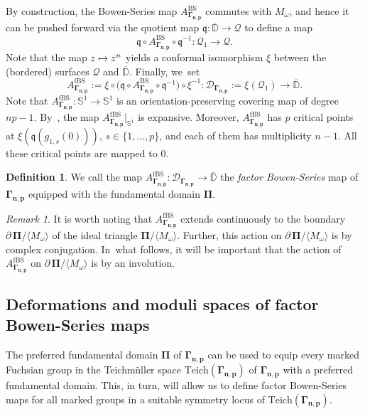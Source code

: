 \documentclass[10pt,a4paper]{amsart}
\def\mto{\mathchoice{\longmapsto}{\mapsto}{\mapsto}{\mapsto}}
\theoremstyle{definition}
\newtheorem{definition}[lemma]{Definition}
\theoremstyle{remark}
\newtheorem{remark}[lemma]{Remark}
\newcommand{\D}{\mathbb{D}}
\begin{document}
By construction, the Bowen-Series map $A_{\pmb{\Gamma_{n,p}}}^{\mathrm{BS}}$ commutes with $M_\omega$, and hence it can be pushed forward via the quotient map $\mathfrak{q}:\overline{\D}\to\mathcal{Q}$ to define a map
\[
\mathfrak{q}\circ A_{\pmb{\Gamma_{n,p}}}^{\mathrm{BS}}\circ\mathfrak{q}^{-1}: \mathcal{Q}_1\to\mathcal{Q}.
\]
Note that the map $z\mto z^{n}$ yields a conformal isomorphism $\xi$ between the (bordered) surfaces $\mathcal{Q}$ and $\overline{\D}$. Finally, we~set
\[
A_{\pmb{\Gamma_{n,p}}}^{\mathrm{fBS}}:= \xi\circ \bigl(\mathfrak{q}\circ A_{\pmb{\Gamma_{n,p}}}^{\mathrm{BS}}\circ\mathfrak{q}^{-1}\bigr) \circ \xi^{-1}: \mathcal{D}_{\pmb{\Gamma_{n,p}}}:=\xi(\mathcal{Q}_1)\to \overline{\D}.
\]
Note that $A_{\pmb{\Gamma_{n,p}}}^{\mathrm{fBS}}:\mathbb{S}^1\to\mathbb{S}^1$ is an orientation-preserving covering map of degree $np-1$. By~\cite[Lem.\,3.7]{LMMN}, the map $A_{\pmb{\Gamma_{n,p}}}^{\mathrm{fBS}}\vert_{\mathbb{S}^1}$ is expansive. Moreover, $A_{\pmb{\Gamma_{n,p}}}^{\mathrm{fBS}}$ has $p$ critical points at $\xi(\mathfrak{q}(g_{1,s}(0)))$, $s\in\{1,\dots, p\}$, and each of them has multiplicity $n-1$. All these critical points are mapped to $0$.

\begin{definition}\label{factor_bs_base_def}
We call the map $A_{\pmb{\Gamma_{n,p}}}^{\mathrm{fBS}}: \mathcal{D}_{\pmb{\Gamma_{n,p}}}\to \overline{\D}$ the \emph{factor Bowen-Series} map of $\pmb{\Gamma_{n,p}}$ equipped with the fundamental domain $\pmb{\Pi}$.
\end{definition}

\begin{remark}\label{rmk-Pi}
It is worth noting that
$A_{\pmb{\Gamma_{n,p}}}^{\mathrm{fBS}}$ extends continuously to the boundary $\partial \, \pmb{\Pi}/\langle M_\omega\rangle$ of the ideal triangle $\pmb{\Pi}/\langle M_\omega\rangle$. Further, this action on $\partial \, \pmb{\Pi}/\langle M_\omega\rangle$ is by complex conjugation. In~what follows, it will be important that the action of $A_{\pmb{\Gamma_{n,p}}}^{\mathrm{fBS}}$ on $\partial \, \pmb{\Pi}/\langle M_\omega\rangle$ is by an involution.
\end{remark}

\subsection{Deformations and moduli spaces of factor Bowen-Series maps}\label{factor_bs_gen_subsec}

The preferred fundamental domain $\pmb{\Pi}$ of $\pmb{\Gamma_{n,p}}$ can be used to equip every marked Fuchsian group in the Teichmüller space $\mathrm{Teich}(\pmb{\Gamma_{n,p}})$ of $\pmb{\Gamma_{n,p}}$ with a preferred fundamental domain. This, in turn, will allow us to define factor Bowen-Series maps for all marked groups in a suitable symmetry locus of $\mathrm{Teich}(\pmb{\Gamma_{n,p}})$.
\end{document}
